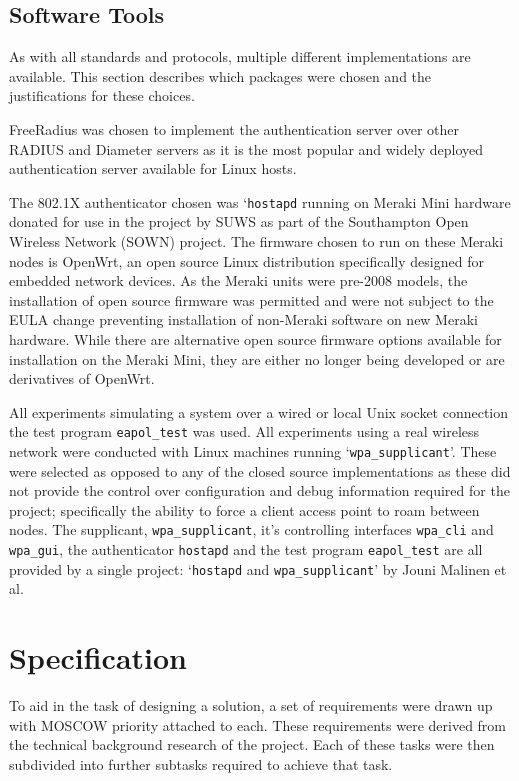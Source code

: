\documentclass[pdftex, 12pt, a4paper]{article}
\begin{document}
\subsection{Software Tools}
As with all standards and protocols, multiple different implementations are available.  This section describes which packages were chosen and the justifications for these choices.

FreeRadius was chosen to implement the authentication server over other RADIUS and Diameter servers as it is the most popular and widely deployed authentication server available for Linux hosts.

The 802.1X authenticator chosen was `\verb`hostapd` running on Meraki Mini hardware donated for use in the project by SUWS as part of the Southampton Open Wireless Network (SOWN) project.  The firmware chosen to run on these Meraki nodes is OpenWrt, an open source Linux distribution specifically designed for embedded network devices. As the Meraki units were pre-2008 models, the installation of open source firmware was permitted and were not subject to the EULA change preventing installation of non-Meraki software on new Meraki hardware. While there are alternative open source firmware options available for installation on the Meraki Mini, they are either no longer being developed or are derivatives of OpenWrt\cite{merakieula}.


All experiments simulating a system over a wired or local Unix socket connection the test program \verb`eapol_test` was used. All experiments using a real wireless network were conducted with Linux machines running `\verb`wpa_supplicant`'. These were selected as opposed to any of the closed source implementations as these did not provide the control over configuration and debug information required for the project; specifically the ability to force a client access point to roam between nodes.  The supplicant, \verb`wpa_supplicant`, it's controlling interfaces \verb`wpa_cli` and \verb`wpa_gui`, the authenticator \verb`hostapd` and the test program \verb`eapol_test` are all provided by a single project: `\verb`hostapd` and \verb`wpa_supplicant`' by Jouni Malinen et al\cite{wpahostapd}.

\section{Specification}
To aid in the task of designing a solution, a set of  requirements were drawn up with MOSCOW priority attached to each. These requirements were derived from the technical background research of the project.  Each of these tasks were then subdivided into further subtasks required to achieve that task.
\end{document}

